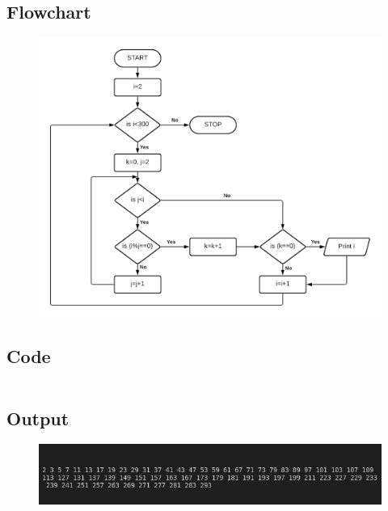 \documentclass[12pt]{article}
\begin{document}
\section{}
\subsection{Flowchart}
\begin{figure}[h]
    \centering
    \includegraphics[width=1.1\textwidth]{Flowchart06.png}
\end{figure}
\newpage
\subsection{Code}
\inputminted{c}{q6.c}
\subsection{Output}
\begin{figure}[h]
    \centering
    \includegraphics[width=1.0\textwidth]{6.png}
\end{figure}
\newpage
\section{}
\end{document}
